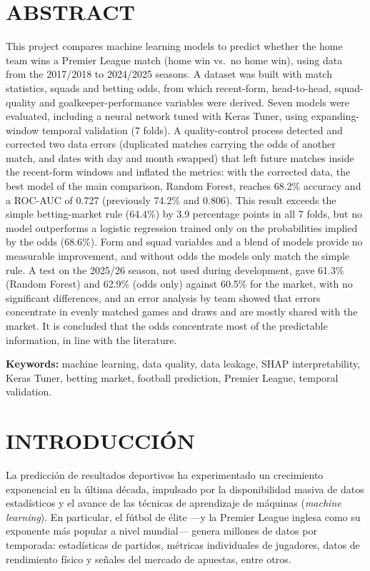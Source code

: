 \documentclass[12pt,letterpaper,oneside]{report}
\begin{document}
\clearpage
\chapter*{ABSTRACT}
\begin{singlespace}
This project compares machine learning models to predict whether the home team wins a Premier League match (home win vs.\ no home win), using data from the 2017/2018 to 2024/2025 seasons. A dataset was built with match statistics, squads and betting odds, from which recent-form, head-to-head, squad-quality and goalkeeper-performance variables were derived. Seven models were evaluated, including a neural network tuned with Keras Tuner, using expanding-window temporal validation (7 folds). A quality-control process detected and corrected two data errors (duplicated matches carrying the odds of another match, and dates with day and month swapped) that left future matches inside the recent-form windows and inflated the metrics: with the corrected data, the best model of the main comparison, Random Forest, reaches 68.2\% accuracy and a ROC-AUC of 0.727 (previously 74.2\% and 0.806). This result exceeds the simple betting-market rule (64.4\%) by 3.9 percentage points in all 7 folds, but no model outperforms a logistic regression trained only on the probabilities implied by the odds (68.6\%). Form and squad variables and a blend of models provide no measurable improvement, and without odds the models only match the simple rule. A test on the 2025/26 season, not used during development, gave 61.3\% (Random Forest) and 62.9\% (odds only) against 60.5\% for the market, with no significant differences, and an error analysis by team showed that errors concentrate in evenly matched games and draws and are mostly shared with the market. It is concluded that the odds concentrate most of the predictable information, in line with the literature.
\end{singlespace}

\textbf{Keywords:} machine learning, data quality, data leakage, SHAP interpretability, Keras Tuner, betting market, football prediction, Premier League, temporal validation.

\clearpage
{}

\chapter{INTRODUCCIÓN}
\label{sec:introduction}
La predicción de resultados deportivos ha experimentado un crecimiento exponencial en la última década, impulsado por la disponibilidad masiva de datos estadísticos y el avance de las técnicas de aprendizaje de máquinas (\textit{machine learning}). En particular, el fútbol de élite ---y la Premier League inglesa como su exponente más popular a nivel mundial--- genera millones de datos por temporada: estadísticas de partidos, métricas individuales de jugadores, datos de rendimiento físico y señales del mercado de apuestas, entre otros.
\end{document}
